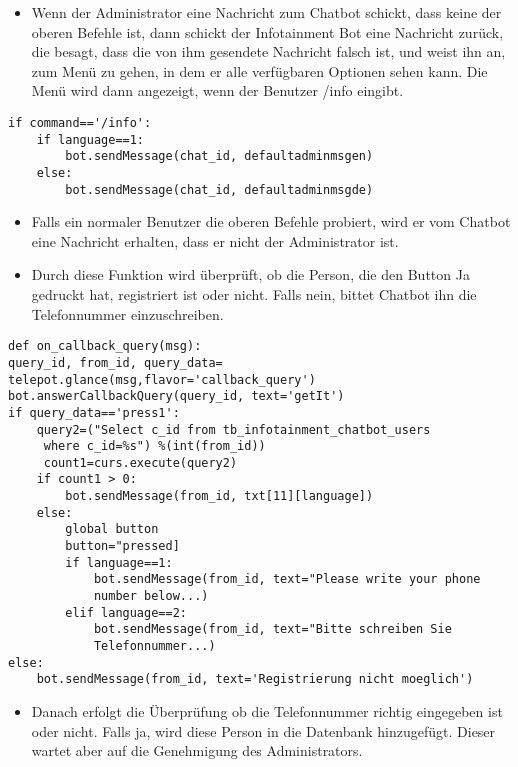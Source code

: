 \begin{itemize}
	\item Wenn der Administrator eine Nachricht zum Chatbot schickt, dass keine der oberen Befehle ist, dann schickt der Infotainment Bot eine Nachricht zur\"uck, die besagt, dass die von ihm gesendete Nachricht falsch ist, und weist ihn an, zum Menü zu gehen, in dem er alle verfügbaren Optionen sehen kann. Die Men\"u wird dann angezeigt, wenn der Benutzer /info eingibt.
\end{itemize}
\begin{lstlisting}[frame=single]
if command=='/info':
	if language==1:
		bot.sendMessage(chat_id, defaultadminmsgen)
	else:
		bot.sendMessage(chat_id, defaultadminmsgde)
\end{lstlisting}
\begin{itemize}
	\item Falls ein normaler Benutzer die oberen Befehle probiert, wird er vom Chatbot eine Nachricht erhalten, dass er nicht der Administrator ist.
\end{itemize}
\begin{itemize}
	\item Durch diese Funktion wird überprüft, ob die Person, die den Button Ja gedruckt hat, registriert ist oder nicht. Falls nein, bittet Chatbot ihn die Telefonnummer einzuschreiben.
\end{itemize}
\begin{lstlisting}[frame=single]
def on_callback_query(msg):
query_id, from_id, query_data=
telepot.glance(msg,flavor='callback_query')
bot.answerCallbackQuery(query_id, text='getIt')
if query_data=='press1':
	query2=("Select c_id from tb_infotainment_chatbot_users
	 where c_id=%s") %(int(from_id))
	 count1=curs.execute(query2)
	if count1 > 0:
		bot.sendMessage(from_id, txt[11][language])
	else:
		global button
		button="pressed]
		if language==1:
			bot.sendMessage(from_id, text="Please write your phone 
			number below...)
		elif language==2:
			bot.sendMessage(from_id, text="Bitte schreiben Sie 
			Telefonnummer...)
else:
	bot.sendMessage(from_id, text='Registrierung nicht moeglich')
\end{lstlisting}
\begin{itemize}
	\item Danach erfolgt die Überprüfung ob die Telefonnummer richtig eingegeben ist oder nicht. Falls ja, wird diese Person in die Datenbank hinzugefügt. Dieser wartet aber auf die Genehmigung des Administrators.
\end{itemize}

